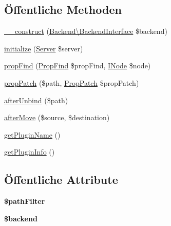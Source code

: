 \subsection*{Öffentliche Methoden}
\begin{DoxyCompactItemize}
\item 
\mbox{\hyperlink{class_sabre_1_1_d_a_v_1_1_property_storage_1_1_plugin_a5765023c0b1df922ce56fe20d6601d54}{\+\_\+\+\_\+construct}} (\mbox{\hyperlink{interface_sabre_1_1_d_a_v_1_1_property_storage_1_1_backend_1_1_backend_interface}{Backend\textbackslash{}\+Backend\+Interface}} \$backend)
\item 
\mbox{\hyperlink{class_sabre_1_1_d_a_v_1_1_property_storage_1_1_plugin_a303796e166e3f2b4d9ef31b14a3c5f6c}{initialize}} (\mbox{\hyperlink{class_sabre_1_1_d_a_v_1_1_server}{Server}} \$server)
\item 
\mbox{\hyperlink{class_sabre_1_1_d_a_v_1_1_property_storage_1_1_plugin_a99012167254e23e12af6b962b8d27c23}{prop\+Find}} (\mbox{\hyperlink{class_sabre_1_1_d_a_v_1_1_prop_find}{Prop\+Find}} \$prop\+Find, \mbox{\hyperlink{interface_sabre_1_1_d_a_v_1_1_i_node}{I\+Node}} \$node)
\item 
\mbox{\hyperlink{class_sabre_1_1_d_a_v_1_1_property_storage_1_1_plugin_acfe3eaf043730d6d861263e9901cf97f}{prop\+Patch}} (\$path, \mbox{\hyperlink{class_sabre_1_1_d_a_v_1_1_prop_patch}{Prop\+Patch}} \$prop\+Patch)
\item 
\mbox{\hyperlink{class_sabre_1_1_d_a_v_1_1_property_storage_1_1_plugin_ab02cbe13b1349e07d244d73f98bcf5d5}{after\+Unbind}} (\$path)
\item 
\mbox{\hyperlink{class_sabre_1_1_d_a_v_1_1_property_storage_1_1_plugin_aba80ddeb4f6e1dfa67c43cbf6000d867}{after\+Move}} (\$source, \$destination)
\item 
\mbox{\hyperlink{class_sabre_1_1_d_a_v_1_1_property_storage_1_1_plugin_a722c15e74fa0ae4df44b52bc6ca74cf0}{get\+Plugin\+Name}} ()
\item 
\mbox{\hyperlink{class_sabre_1_1_d_a_v_1_1_property_storage_1_1_plugin_a548b734bf353d12140ce234efaf92bc5}{get\+Plugin\+Info}} ()
\end{DoxyCompactItemize}
\subsection*{Öffentliche Attribute}
\begin{DoxyCompactItemize}
\item 
\mbox{\label{class_sabre_1_1_d_a_v_1_1_property_storage_1_1_plugin_ad5f76ec6e2959bc29435d13708616947}} 
{\bfseries \$path\+Filter}
\item 
\mbox{\label{class_sabre_1_1_d_a_v_1_1_property_storage_1_1_plugin_a6f8550fccf778f5f6fe37f892900e34d}} 
{\bfseries \$backend}
\end{DoxyCompactItemize}


